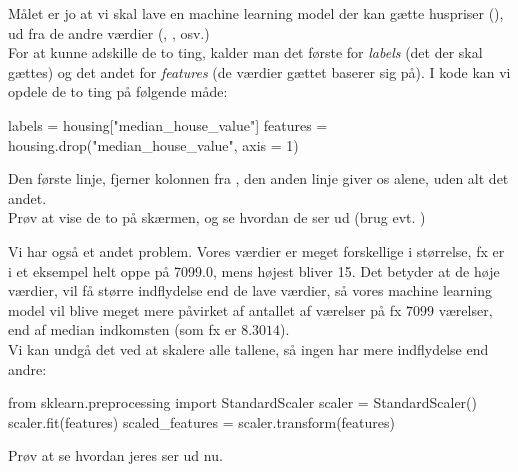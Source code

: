\documentclass{ucph-handout}
\begin{document}


\begin{exercisebox}[adjusted title=Opdeling i labels og features]
Målet er jo at vi skal lave en machine learning model der kan gætte huspriser (), ud fra de andre værdier (, , osv.)\\ %

For at kunne adskille de to ting, kalder man det første for \textit{labels} (det der skal gættes) og det andet for \textit{features} (de værdier gættet baserer sig på). I kode kan vi opdele de to ting på følgende måde:
\begin{python}
labels = housing["median_house_value"]
features = housing.drop("median_house_value", axis = 1)
\end{python}


Den første linje, fjerner  kolonnen fra , den anden linje giver os  alene, uden alt det andet.\\

Prøv at vise de to på skærmen, og se hvordan de ser ud (brug evt. )

Vi har også et andet problem. Vores værdier er meget forskellige i størrelse, fx er  i et eksempel helt oppe på 7099.0, mens  højest bliver 15. Det betyder at de høje værdier, vil få større indflydelse end de lave værdier, så vores machine learning model vil blive meget mere påvirket af antallet af værelser på fx $7099$ værelser, end af median indkomsten (som fx er $8.3014$).\\

Vi kan undgå det ved at skalere alle tallene, så ingen har mere indflydelse end andre:
\begin{python}
from sklearn.preprocessing import StandardScaler
scaler = StandardScaler()
scaler.fit(features)
scaled_features = scaler.transform(features)
\end{python}

Prøv at se hvordan jeres  ser ud nu.
\end{exercisebox}
\end{document}
